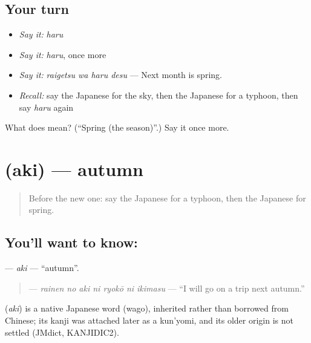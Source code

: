 \subsection*{Your turn}
\begin{itemize}
\raggedright
  \item \emph{Say it:} \emph{haru}
  \item \emph{Say it:} \emph{haru}, once more
  \item \emph{Say it:} \emph{raigetsu wa haru desu} — Next month is spring.
  \item \emph{Recall:} say the Japanese for the sky, then the Japanese for a typhoon, then say \emph{haru} again
\end{itemize}

\begin{tcolorbox}[breakable,colback=teal!4,colframe=teal!35!black,title={Before you move on}]
What does  mean? (\textquotedblleft{}Spring (the season)\textquotedblright{}.) Say it once more.
\end{tcolorbox}
\section[\texorpdfstring{\ja{あき} (aki)}{あき (aki)}]{ (aki) — autumn}

\label{lesson:JA-C209-aki}



\begin{quote}
Before the new one: say the Japanese for a typhoon, then the Japanese for spring.
\end{quote}

\subsection*{You'll want to know: }
\textbf{} — \emph{aki} — \textquotedblleft{}autumn\textquotedblright{}.

\begin{quote}
\textbf{   } — \emph{rainen no aki ni ryokō ni ikimasu} — \textquotedblleft{}I will go on a trip next autumn.\textquotedblright{}
\end{quote}

\begin{cousinweb}
\textbf{} (\emph{aki}) is a native Japanese word (wago), inherited rather than borrowed from Chinese; its kanji was attached later as a kun'yomi, and its older origin is not settled (JMdict, KANJIDIC2).
\end{cousinweb}

